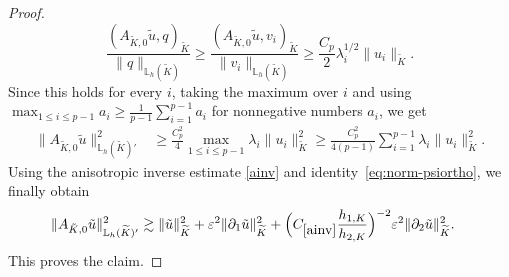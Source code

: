 \documentclass[10pt,a4paper]{amsart}
\newcommand{\AKO}{{A_{\tilde K,0}}}
\newcommand{\Kt}{\widetilde{K}}
\newcommand{\const}[1]{C_{\eqref{#1}}}
\newcommand{\eps}{\varepsilon}
\newcommand{\hKot}{h_{1,K}}
\newcommand{\hKtt}{h_{2,K}}
\begin{document}
\begin{proof}
\begin{equation*}
	\frac{(\AKO\tilde u,q)_{\Kt}}{\|q\|_{\mathbb L_h(\Kt)}}
	\ge
	\frac{(\AKO\tilde u,v_i)_{\Kt}}{\|v_i\|_{\mathbb L_h(\Kt)}}
	\ge
	\frac{C_p}{2}\lambda_i^{1/2}\|u_i\|_{\Kt} .
	\end{equation*}
	Since this holds for every \(i\), taking the maximum over \(i\) and using
	\(
	\max_{1\le i\le p-1} a_i \ge \frac1{p-1}\sum_{i=1}^{p-1} a_i
	\)
	for nonnegative numbers \(a_i\), we get 
	\begin{align*}
	\|\AKO\tilde u\|_{\mathbb L_h(\Kt)'}^2
	&\ge
	\frac{C_p^2}{4}
	\max_{1\le i\le p-1}\lambda_i\|u_i\|_{\Kt}^2
	\ge
	\frac{C_p^2}{4(p-1)} \sum_{i=1}^{p-1}\lambda_i\|u_i\|_{\Kt}^2.
	\end{align*}
	Using the anisotropic inverse estimate \eqref{ainv} and 
    identity~\eqref{eq:norm-psiortho}, we finally obtain
	\begin{align*}
	\|\AKO\tilde u\|_{\mathbb L_h(\Kt)'}^2
	&\gtrsim
	\|\tilde u\|_{\Kt}^2
	+\eps^2\|\partial_1\tilde u\|_{\Kt}^2
	+\Big(\const{ainv}\frac{\hKot}{\hKtt}\Big)^{-2}\eps^2\|\partial_2\tilde u\|_{\Kt}^2
	.
	\end{align*}
	This proves the claim.
	\end{proof}
\end{document}

